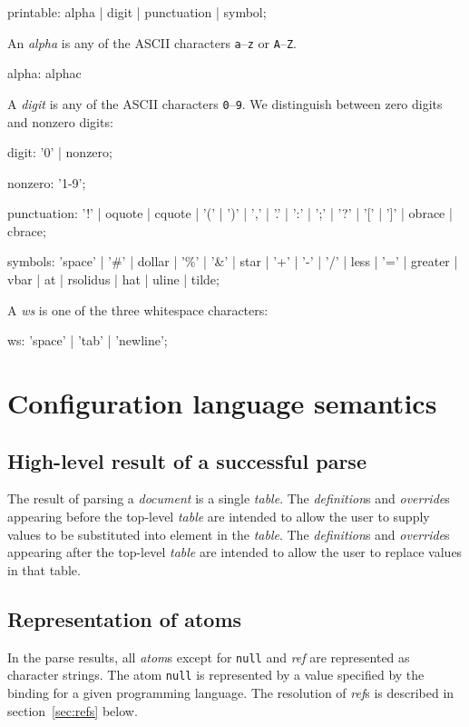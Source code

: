 \documentclass{memarticle}
\begin{document}
\begin{rail}
	printable: alpha | digit | punctuation | symbol;
\end{rail}

An \emph{alpha} is any of the ASCII characters \texttt{a}--\texttt{z}
or \texttt{A}--\texttt{Z}.
\begin{rail}
alpha: alphac
\end{rail}

A \emph{digit} is any of the ASCII characters \texttt{0}--\texttt{9}.
We distinguish between zero digits and nonzero digits:
\begin{rail}
digit: '0' | nonzero;
\end{rail}
\begin{rail}
	nonzero: '1-9';	
\end{rail}
\begin{rail}
	punctuation: '!' | oquote | cquote | '(' | ')' | ',' | '.' | ':' | ';' | '?' | '[' | ']' | obrace | cbrace;
\end{rail}

\begin{rail}
  symbols: 'space' | '\#' | dollar | '\%' | '\&' | star | '+' | '-' | '/' | less | '=' | greater | vbar | at | rsolidus | hat | uline | tilde;
\end{rail}

A \emph{ws} is one of the three whitespace characters:
\begin{rail}
	ws: 'space' | 'tab' | 'newline';
\end{rail}

\chapter{Configuration language semantics}
\section{High-level result of a successful parse}

The result of parsing a \emph{document}
is a single \emph{table}.
The \emph{definition}s and \emph{override}s
appearing before the top-level \emph{table}
are intended to allow the user
to supply values to be substituted into element in the \emph{table}.
The \emph{definition}s and \emph{override}s
appearing after the top-level \emph{table}
are intended to allow the user
to replace values in that table.

\section{Representation of atoms}
In the parse results,
all \emph{atom}s
except for \texttt{null} and \emph{ref}
are represented
as character strings.
The atom \texttt{null} is represented by a 
value specified by the binding for a given programming language.
The resolution of \emph{ref}s is described in section~\ref{sec:refs} below.
\end{document}

